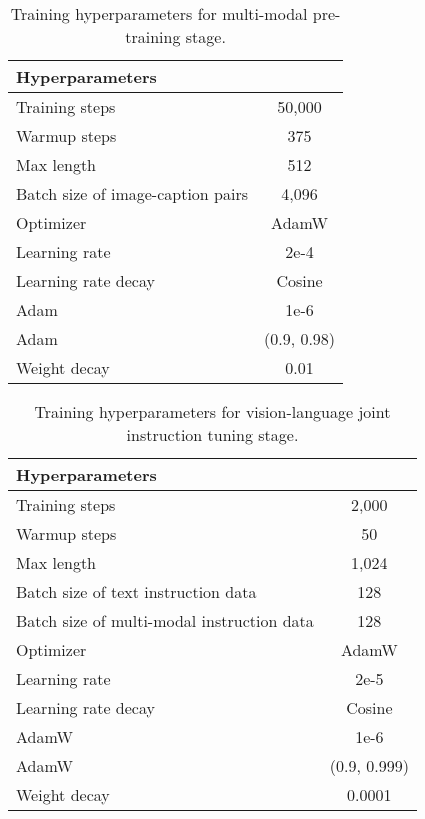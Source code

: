 \documentclass{article}
\begin{document}
\begin{table}[ht]
\centering
\begin{tabular}{lc}
\toprule
\textbf{Hyperparameters} & \\ \midrule
Training steps             &       50,000 \\
Warmup steps                      &       375 \\
Max length        &       512 \\
Batch size of image-caption pairs  &       4,096 \\
Optimizer & AdamW \\
Learning rate & 2e-4 \\
Learning rate decay & Cosine \\
Adam  & 1e-6 \\
Adam  & (0.9, 0.98) \\
Weight decay & 0.01 \\
\bottomrule
\end{tabular}
\vspace{1ex}
\caption{Training hyperparameters for multi-modal pre-training stage.}
\label{tbl:hyperparam:pt}
\end{table}

\begin{table}[ht]
\centering
\begin{tabular}{lc}
\toprule
\textbf{Hyperparameters} & \\ \midrule
Training steps                   &       2,000 \\
Warmup steps                      &       50 \\
Max length         &       1,024 \\
Batch size of text instruction data  &       128 \\
Batch size of multi-modal instruction data  &   128 \\
Optimizer & AdamW \\
Learning rate & 2e-5 \\
Learning rate decay & Cosine \\
AdamW  & 1e-6 \\
AdamW  & (0.9, 0.999) \\
Weight decay & 0.0001 \\
\bottomrule
\end{tabular}
\vspace{1ex}
\caption{Training hyperparameters for vision-language joint instruction tuning stage.}
\label{tbl:hyperparam:ft}
\end{table}
\end{document}
